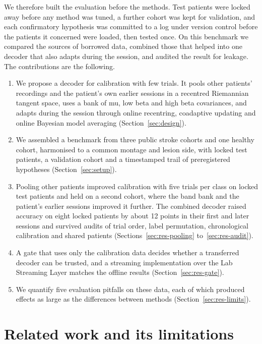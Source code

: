 \documentclass[pdflatex,sn-mathphys-num]{sn-jnl}
\begin{document}
We therefore built the evaluation before the methods. Test patients were locked away before any method was tuned, a further cohort was kept for validation, and each confirmatory hypothesis was committed to a log under version control before the patients it concerned were loaded, then tested once. On this benchmark we compared the sources of borrowed data, combined those that helped into one decoder that also adapts during the session, and audited the result for leakage. The contributions are the following.
\begin{enumerate}
\item We propose a decoder for calibration with few trials. It pools other patients' recordings and the patient's own earlier sessions in a recentred Riemannian tangent space, uses a bank of mu, low beta and high beta covariances, and adapts during the session through online recentring, coadaptive updating and online Bayesian model averaging (Section~\ref{sec:design}).
\item We assembled a benchmark from three public stroke cohorts and one healthy cohort, harmonised to a common montage and lesion side, with locked test patients, a validation cohort and a timestamped trail of preregistered hypotheses (Section~\ref{sec:setup}).
\item Pooling other patients improved calibration with five trials per class on locked test patients and held on a second cohort, where the band bank and the patient's earlier sessions improved it further. The combined decoder raised accuracy on eight locked patients by about 12 points in their first and later sessions and survived audits of trial order, label permutation, chronological calibration and shared patients (Sections~\ref{sec:res-pooling} to~\ref{sec:res-audit}).
\item A gate that uses only the calibration data decides whether a transferred decoder can be trusted, and a streaming implementation over the Lab Streaming Layer matches the offline results (Section~\ref{sec:res-gate}).
\item We quantify five evaluation pitfalls on these data, each of which produced effects as large as the differences between methods (Section~\ref{sec:res-limits}).
\end{enumerate}

\section{Related work and its limitations}\label{sec:related}
\end{document}
